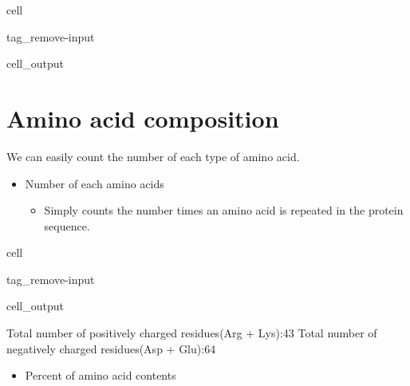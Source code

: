 \documentclass[letterpaper,10pt,english]{jupyterBook}
\begin{document}
\begin{sphinxuseclass}{cell}
\begin{sphinxuseclass}{tag_remove-input}\begin{sphinxVerbatimOutput}

\begin{sphinxuseclass}{cell_output}
\noindent{}

\end{sphinxuseclass}\end{sphinxVerbatimOutput}

\end{sphinxuseclass}
\end{sphinxuseclass}

\section{Amino acid composition}
\label{\detokenize{ipynb/chapter1:amino-acid-composition}}
\sphinxAtStartPar
We can easily count the number of each type of amino acid.
\begin{itemize}
\item {} 
\sphinxAtStartPar
Number of each amino acids
\begin{itemize}
\item {} 
\sphinxAtStartPar
Simply counts the number times an amino acid is repeated in the protein sequence.

\end{itemize}

\end{itemize}

\begin{sphinxuseclass}{cell}
\begin{sphinxuseclass}{tag_remove-input}\begin{sphinxVerbatimOutput}

\begin{sphinxuseclass}{cell_output}
\begin{sphinxVerbatim}[commandchars=\\\{\}]
Total number of positively charged residues(Arg + Lys):\PYGZhy{}\PYGZhy{}\PYGZhy{}\PYGZhy{}\PYGZhy{}\PYGZhy{}\PYGZhy{}\PYGZhy{}43
Total number of negatively charged residues(Asp + Glu):\PYGZhy{}\PYGZhy{}\PYGZhy{}\PYGZhy{}\PYGZhy{}\PYGZhy{}\PYGZhy{}\PYGZhy{}64
\end{sphinxVerbatim}

\noindent{}

\end{sphinxuseclass}\end{sphinxVerbatimOutput}

\end{sphinxuseclass}
\end{sphinxuseclass}\begin{itemize}
\item {} 
\sphinxAtStartPar
Percent of amino acid contents

\end{itemize}
\end{document}
